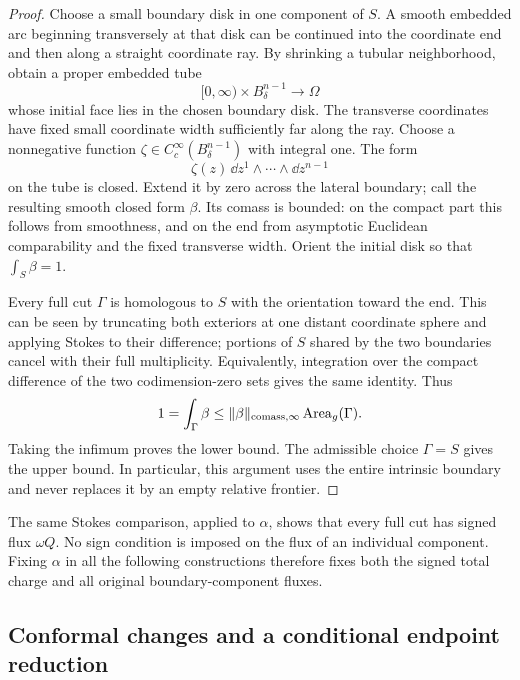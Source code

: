 \begin{proof}
Choose a small boundary disk in one component of $S$.  A smooth embedded
arc beginning transversely at that disk can be continued into the
coordinate end and then along a straight coordinate ray.  By shrinking a
tubular neighborhood, obtain a proper embedded tube
\[
 [0,\infty)\times B^{n-1}_\delta\longrightarrow\Omega
\]
whose initial face lies in the chosen boundary disk.  The transverse
coordinates have fixed small coordinate width sufficiently far along the
ray.  Choose a nonnegative function
$\zeta\in C_c^\infty(B^{n-1}_\delta)$ with integral one.  The form
\[
 \zeta(z)\,\dd z^1\wedge\cdots\wedge\dd z^{n-1}
\]
on the tube is closed.  Extend it by zero across the lateral boundary;
call the resulting smooth closed form $\beta$.  Its comass is bounded:
on the compact part this follows from smoothness, and on the end from
asymptotic Euclidean comparability and the fixed transverse width.
Orient the initial disk so that $\int_S\beta=1$.

Every full cut $\Gamma$ is homologous to $S$ with the orientation toward
the end.  This can be seen by truncating both exteriors at one distant
coordinate sphere and applying Stokes to their difference; portions of
$S$ shared by the two boundaries cancel with their full multiplicity.
Equivalently, integration over the compact difference of the two
codimension-zero sets gives the same identity.  Thus
\[
 1=\int_\Gamma\beta
 \leq \|\beta\|_{\mathrm{comass},\infty}\operatorname{Area}_g(\Gamma).
\]
Taking the infimum proves the lower bound.  The admissible choice
$\Gamma=S$ gives the upper bound.  In particular, this argument uses the
entire intrinsic boundary and never replaces it by an empty relative
frontier.
\end{proof}

The same Stokes comparison, applied to $\alpha$, shows that every full
cut has signed flux $\omega Q$.  No sign condition is imposed on the
flux of an individual component.  Fixing $\alpha$ in all the following
constructions therefore fixes both the signed total charge and all
original boundary-component fluxes.

\subsection{Conformal changes and a conditional endpoint reduction}

